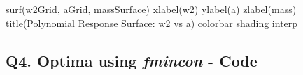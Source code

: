 \documentclass[
  letterpaper,
  DIV=11,
  numbers=noendperiod]{scrartcl}
\newenvironment{Shaded}{\begin{snugshade}}{\end{snugshade}}
\newcommand{\NormalTok}[1]{\textcolor[rgb]{0.00,0.23,0.31}{#1}}
\newcommand{\OperatorTok}[1]{\textcolor[rgb]{0.37,0.37,0.37}{#1}}
\newcommand{\SpecialStringTok}[1]{\textcolor[rgb]{0.13,0.47,0.30}{#1}}
\newcommand{\VariableTok}[1]{\textcolor[rgb]{0.07,0.07,0.07}{#1}}
\begin{document}
\begin{Shaded}
\begin{Highlighting}[]
\VariableTok{surf}\NormalTok{(}\VariableTok{w2Grid}\OperatorTok{,} \VariableTok{aGrid}\OperatorTok{,} \VariableTok{massSurface}\NormalTok{)}
\VariableTok{xlabel}\NormalTok{(}\SpecialStringTok{\textquotesingle{}w2\textquotesingle{}}\NormalTok{)}
\VariableTok{ylabel}\NormalTok{(}\SpecialStringTok{\textquotesingle{}a\textquotesingle{}}\NormalTok{)}
\VariableTok{zlabel}\NormalTok{(}\SpecialStringTok{\textquotesingle{}mass\textquotesingle{}}\NormalTok{)}
\VariableTok{title}\NormalTok{(}\SpecialStringTok{\textquotesingle{}Polynomial Response Surface: w2 vs a\textquotesingle{}}\NormalTok{)}
\VariableTok{colorbar}
\VariableTok{shading} \VariableTok{interp}
\end{Highlighting}
\end{Shaded}

\subsection{\texorpdfstring{Q4. Optima using \textbf{\emph{fmincon}} -
Code}{Q4. Optima using fmincon - Code}}\label{q4.-optima-using-fmincon---code}
\end{document}
